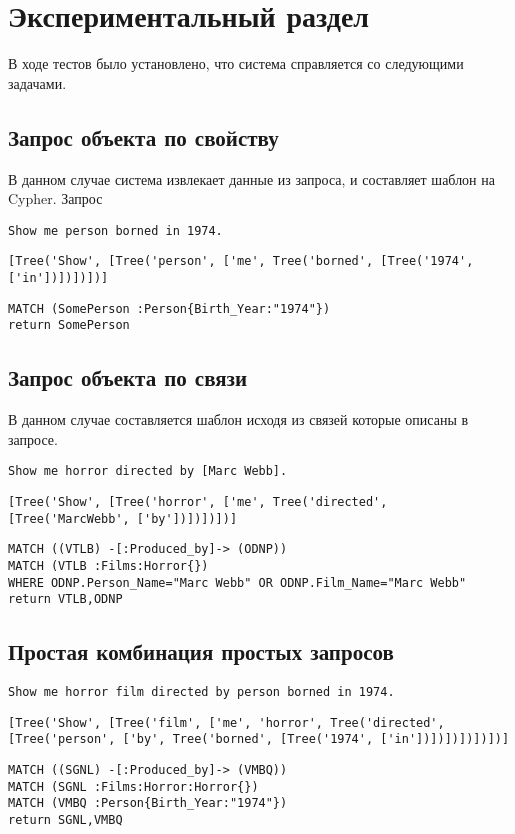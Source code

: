 \chapter{Экспериментальный раздел}
\label{cha:research}
В ходе тестов было установлено, что система справляется со следующими задачами.
\section{Запрос объекта по свойству}
В данном случае система извлекает данные из запроса, и составляет шаблон на Cypher. 
Запрос
\begin{lstlisting}[caption={Запрос}]
Show me person borned in 1974.
\end{lstlisting}
\begin{lstlisting}[caption={Дерево}]
[Tree('Show', [Tree('person', ['me', Tree('borned', [Tree('1974', ['in'])])])])]
\end{lstlisting}
\begin{lstlisting}[caption={Результат}]
MATCH (SomePerson :Person{Birth_Year:"1974"})
return SomePerson
\end{lstlisting}

\section{Запрос объекта по связи}
В данном случае составляется шаблон исходя из связей которые описаны в запросе.
\begin{lstlisting}[caption={Запрос}]
Show me horror directed by [Marc Webb].
\end{lstlisting}
\begin{lstlisting}[caption={Дерево}]
[Tree('Show', [Tree('horror', ['me', Tree('directed', [Tree('MarcWebb', ['by'])])])])]
\end{lstlisting}
\begin{lstlisting}[caption={Результат}]
MATCH ((VTLB) -[:Produced_by]-> (ODNP))
MATCH (VTLB :Films:Horror{})
WHERE ODNP.Person_Name="Marc Webb" OR ODNP.Film_Name="Marc Webb"
return VTLB,ODNP
\end{lstlisting}

\section{Простая комбинация простых запросов}
\begin{lstlisting}[caption={Запрос}]
Show me horror film directed by person borned in 1974.
\end{lstlisting}
\begin{lstlisting}[caption={Дерево}]
[Tree('Show', [Tree('film', ['me', 'horror', Tree('directed', [Tree('person', ['by', Tree('borned', [Tree('1974', ['in'])])])])])])]
\end{lstlisting}
\begin{lstlisting}[caption={Результат}]
MATCH ((SGNL) -[:Produced_by]-> (VMBQ))
MATCH (SGNL :Films:Horror:Horror{})
MATCH (VMBQ :Person{Birth_Year:"1974"})
return SGNL,VMBQ
\end{lstlisting}
